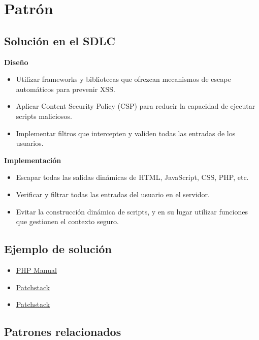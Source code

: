\section{Patrón}

\subsection*{Solución en el SDLC}
\textbf{Diseño}

\begin{itemize}
    \item Utilizar frameworks y bibliotecas que ofrezcan mecanismos de escape automáticos para prevenir XSS.
    \item Aplicar Content Security Policy (CSP) para reducir la capacidad de ejecutar scripts maliciosos.
    \item Implementar filtros que intercepten y validen todas las entradas de los usuarios.
\end{itemize}

\textbf{Implementación}

\begin{itemize}
    \item Escapar todas las salidas dinámicas de HTML, JavaScript, CSS, PHP, etc.
    \item Verificar y filtrar todas las entradas del usuario en el servidor.
    \item Evitar la construcción dinámica de scripts, y en su lugar utilizar funciones que gestionen el contexto seguro.
\end{itemize}

\subsection*{Ejemplo de solución}

\begin{itemize}
    \item \href{https://www.php.net/manual/en/function.htmlspecialchars.php}{PHP Manual}
    \item \href{https://patchstack.com/academy/wordpress/securing-code/cross-site-scripting/}{Patchstack}
    \item \href{https://patchstack.com/academy/wordpress/vulnerabilities/cross-site-scripting/}{Patchstack}
\end{itemize}

\subsection*{Patrones relacionados}

